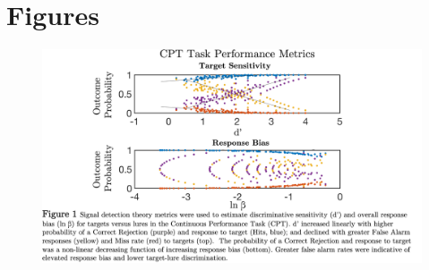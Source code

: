\documentclass[utf8]{stylesheet}
\begin{document}
\section{Figures}
\begin{figure}[h!]
\includegraphics[width=\textwidth,height=\textheight,keepaspectratio]{Fig-1}
\caption{\label{fig:1}}
\end{figure}
\end{document}
